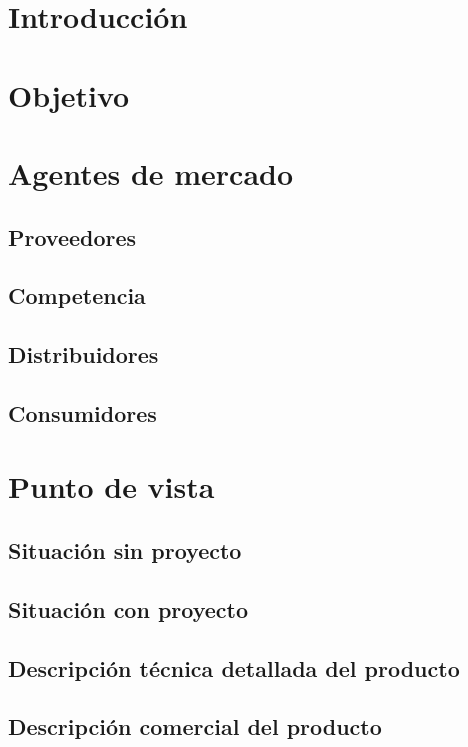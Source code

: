 \documentclass{article}
\begin{document}
	\section{Introducci\'on}

	\section{Objetivo}

	\section{Agentes de mercado}
		\subsection{Proveedores}

		\subsection{Competencia}

		\subsection{Distribuidores}

		\subsection{Consumidores}

	\section{Punto de vista}
		\subsection{Situaci\'on sin proyecto}

		\subsection{Situaci\'on con proyecto}

		\subsection{Descripci\'on t\'ecnica detallada del producto}

		\subsection{Descripci\'on comercial del producto}
\end{document}
